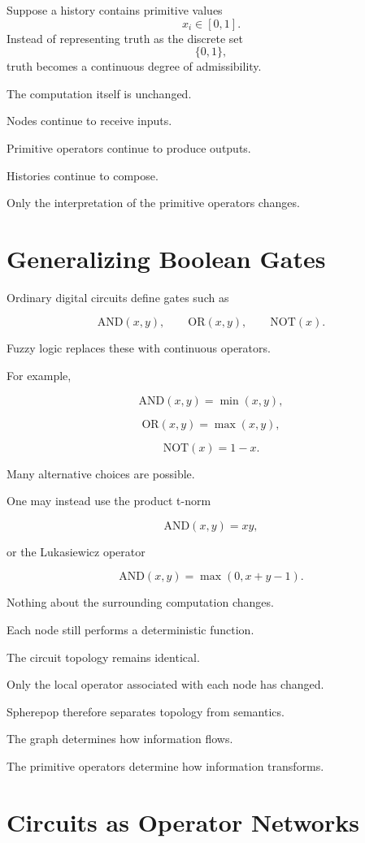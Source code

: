 \documentclass[12pt,oneside]{article}
\begin{document}
Suppose a history contains primitive values
\[
x_i\in[0,1].
\]
Instead of representing truth as the discrete set
\[
\{0,1\},
\]
truth becomes a continuous degree of admissibility.

The computation itself is unchanged.

Nodes continue to receive inputs.

Primitive operators continue to produce outputs.

Histories continue to compose.

Only the interpretation of the primitive operators changes.

\section{Generalizing Boolean Gates}

Ordinary digital circuits define gates such as

\[
\mathrm{AND}(x,y),
\qquad
\mathrm{OR}(x,y),
\qquad
\mathrm{NOT}(x).
\]

Fuzzy logic replaces these with continuous operators.

For example,

\[
\mathrm{AND}(x,y)=\min(x,y),
\]

\[
\mathrm{OR}(x,y)=\max(x,y),
\]

\[
\mathrm{NOT}(x)=1-x.
\]

Many alternative choices are possible.

One may instead use the product t-norm

\[
\mathrm{AND}(x,y)=xy,
\]

or the Lukasiewicz operator

\[
\mathrm{AND}(x,y)=\max(0,x+y-1).
\]

Nothing about the surrounding computation changes.

Each node still performs a deterministic function.

The circuit topology remains identical.

Only the local operator associated with each node has changed.

Spherepop therefore separates topology from semantics.

The graph determines how information flows.

The primitive operators determine how information transforms.

\section{Circuits as Operator Networks}
\end{document}
